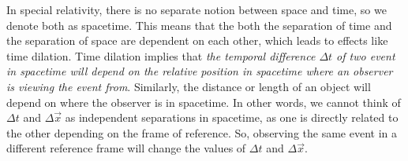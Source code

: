 \documentclass{article}
\begin{document}
 		In special relativity, there is no separate notion between space and time, so we denote both as spacetime. This means that the both the separation of time and the separation of space are dependent on each other, which leads to effects like time dilation. Time dilation implies that \textit{the temporal difference $\Delta t$ of two event in spacetime will depend on the relative position in spacetime where an observer is viewing the event from}. Similarly, the distance or length of an object will depend on where the observer is in spacetime. In other words, we cannot think of $\Delta t$ and $\Delta \vec{x}$ as independent separations in spacetime, as one is directly related to the other depending on the frame of reference. So, observing the same event in a different reference frame will change the values of $\Delta t$ and $\Delta \vec{x}$. 
 		
\end{document}
